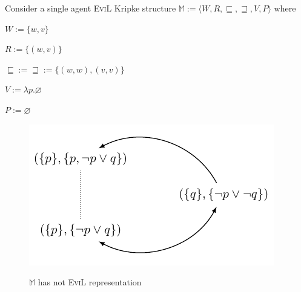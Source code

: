 \begin{lemma}
Consider a single agent \textsc{EviL} Kripke structure $\mathbb{M}:=\langle W, R,
  \sqsubseteq, \sqsupseteq, V, P \rangle$ where
\begin{bul}
  \item $W := \{w,v\}$
  \item $R := \{(w,v)\}$
  \item $ \sqsubseteq := \sqsupseteq := \{(w,w),(v,v)\}$
  \item $V := \lambda p. \varnothing$
  \item $P := \varnothing$
\end{bul}
\end{lemma}
\begin{figure}[ht]
\centering
  \includegraphics[]{evil_pictures/first_fig.pdf}
\label{fig:notevil}
\caption{$\mathbb{M}$ has not \textsc{EviL} representation}
\end{figure}
